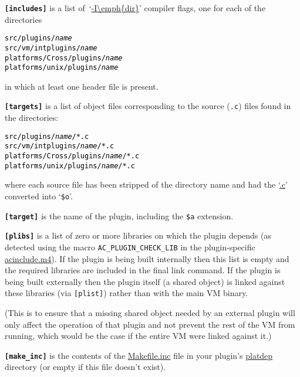 \documentclass{article}
\newcommand{\cmd}{\url}
\newcommand{\cmd}{\texttt}
\begin{document}
\texttt{\textbf{[includes]}}
is a list of~`\cmd{-I\emph{dir}}'
compiler flags, one for each of the
directories
\textcolor{black}{\begin{alltt}
  src/plugins/\emph{name}
  src/vm/intplugins/\emph{name}
  platforms/Cross/plugins/\emph{name}
  platforms/unix/plugins/\emph{name}
\end{alltt}}
in which at least one header file is present.

\texttt{\textbf{[targets]}}
is a list of object files
corresponding to the source (\texttt{.c}) files found in
the directories:
\textcolor{black}{\begin{alltt}
  src/plugins/\emph{name}/*.c
  src/vm/intplugins/\emph{name}/*.c
  platforms/Cross/plugins/\emph{name}/*.c
  platforms/unix/plugins/\emph{name}/*.c
\end{alltt}}
where each source file has been stripped of the directory name and had the
`\cmd{.c}' converted into `\texttt{\$o}'.

\texttt{\textbf{[target]}}
is the name of the plugin, including the
\texttt{\$a} extension.

\texttt{\textbf{[plibs]}}
\label{sec:plibs}
is a list of zero or more libraries on which the plugin depends (as
detected using the macro \texttt{AC\_PLUGIN\_CHECK\_LIB} in the
plugin-specific \cmd{acinclude.m4}).  If the plugin
is being built internally then this list is empty and the required libraries
are included in the final link command.  If the plugin is being built
externally then the plugin itself (a shared object) is linked against
these libraries (via \texttt{[plist]}) rather than with the main VM binary.

(This is to ensure that a missing shared object needed by an external plugin
will only affect the operation of that plugin and not prevent the rest
of the VM from running, which would be the case if the entire VM were
linked against it.)

\texttt{\textbf{[make\_inc]}}
is the contents of the
\cmd{Makefile.inc} file in your plugin's \cmd{platdep} directory (or
empty if this file doesn't exist).
\end{document}
